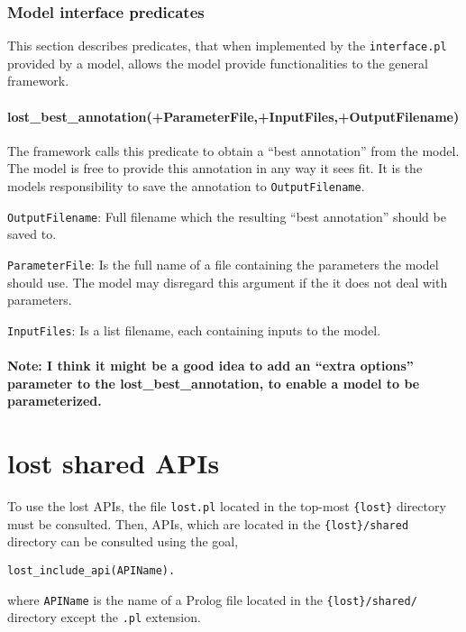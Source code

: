 \documentclass{article}
\begin{document}
\subsubsection{Model interface predicates}

This section describes predicates, that when implemented by 
the \texttt{interface.pl} provided by a model, allows the 
model provide functionalities to the  general framework.

\noindent
\paragraph{lost\_best\_annotation(+ParameterFile,+InputFiles,+OutputFilename)}

The framework calls this predicate to obtain a ``best annotation''
from the model. The model is free to provide this annotation in
any way it sees fit. It is the models responsibility to save the
annotation to \texttt{OutputFilename}.

\texttt{OutputFilename}: Full filename which the resulting ``best
  annotation'' should be saved to.

\texttt{ParameterFile}: Is the full name of a file containing the
parameters the model should use. The model may disregard this argument
if the it does not deal with parameters. 

\texttt{InputFiles}: Is a list filename, each containing inputs to the
model.

\paragraph{Note: I think it might be a good idea to add an ``extra
  options'' parameter to the lost\_best\_annotation, to enable a model
  to be parameterized.}

\section{lost shared APIs}

To use the lost APIs, the file \texttt{lost.pl} located in the
top-most \texttt{\{lost\}} directory must be consulted. Then,
APIs, which are located in the \texttt{\{lost\}/shared} directory
can be consulted using the goal, 
\begin{verbatim}
lost_include_api(APIName).
\end{verbatim}

\noindent
where \texttt{APIName} is the name of a Prolog file located
in the \texttt{\{lost\}/shared/} directory except the \texttt{.pl}
extension.
\end{document}
